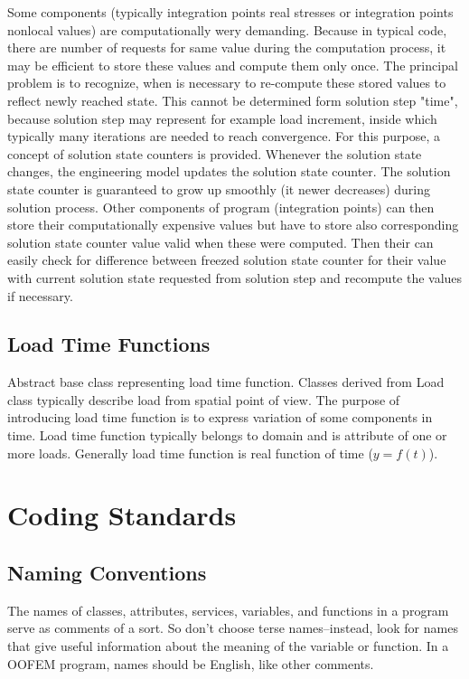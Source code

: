 \documentclass[a4paper]{article}
\begin{document}
Some components (typically integration points real stresses or integration points nonlocal values)
are computationally wery demanding. Because in typical code, there are number of requests for same value 
during the computation process, it may be efficient to store these values and compute them only once.
The principal problem is to recognize, when is necessary to re-compute these stored values to reflect 
newly reached state. This cannot be determined form solution step "time", because solution step may 
represent for example load increment, inside which typically many iterations are needed to reach 
convergence. For this purpose, a concept of solution state counters is provided.
Whenever the solution state changes, the engineering model updates the solution state counter.
The solution state counter is guaranteed to grow up smoothly (it newer decreases) during solution process.
Other components of program (integration points) can then store their computationally expensive values
but have to store also corresponding solution state counter value valid when these were computed.
Then their can easily check for difference between freezed solution state counter for their value with 
current solution state requested from solution step and recompute the values if necessary.

\subsection{Load Time Functions}
Abstract base class representing load time function. Classes derived from Load class typically 
describe load from spatial point of view. The purpose of introducing load time function is to express
variation of some components in time. Load time function typically belongs to domain and is 
attribute of one or more loads. Generally load time function is real function of time ($y=f(t)$).

\section{Coding Standards}
\subsection{Naming Conventions}

The names of classes, attributes, services, variables, and functions
in a program serve as comments of a sort. So don't choose terse names--instead, look for names that give useful information about the meaning of the variable or function. In a OOFEM
program, names should be English, like other comments. 
\end{document}
